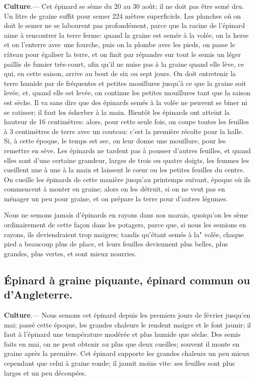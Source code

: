 \documentclass[10pt,a4paper]{book}
\begin{document}
\textbf{Culture}.--- Cet épinard se sème du 20 au 30 août; il ne doit pas être semé dru. Un litre de graine suffit pour semer 224 mètres superficiels. Les planches où on doit le semer ne se labourent pas profondément, parce que la racine de l'épinard aime à rencontrer la terre ferme: quand la graine est semée à la volée, on la herse et on l'enterre avec une fourche, puis on la plombe avec les pieds, on passe le râteau pour égaliser la terre, et on finit par répandre sur tout le semis un léger paillis de fumier très-court, afin qu'il ne nuise pas à la graine quand elle lève, ce qui, en cette saison, arrive au bout de six ou sept jours. On doit entretenir la terre humide par de fréquentes et petites mouillures jusqu'à ce que la graine soit levée, et, quand elle est levée, on continue les petites mouillures tant que la saison est sèche. Il va sans dire que des épinards semés à la volée ne peuvent se biner ni se ratisser; il faut les ésherber à la main. Bientôt les épinards ont atteint la hauteur de 16 centimètres: alors, pour cette seule fois, on coupe toutes les feuilles à 3 centimètres de terre avec un couteau: c'est la première récolte pour la halle. Si, à cette époque, le temps est sec, on leur donne une mouillure, pour les remettre en séve. Les épinards ne tardent pas à pousser d'autres feuilles, et quand elles sont d'une certaine grandeur, larges de trois ou quatre doigts, les femmes les cueillent une à une à la main et laissent le cœur ou les petites feuilles du centre. On cueille les épinards de cette manière jusqu'au printemps suivant, époque où ils commencent à monter en graine; alors on les détruit, si on ne veut pas en ménager un peu pour graine, et on prépare la terre pour d'autres légumes.

Nous ne semons jamais d'épinards en rayons dans nos marais, quoiqu'on les sème ordinairement de cette façon dans les potagers, parce que, si nous les semions en rayons, ils deviendraient trop maigres; tandis qu'étant semés à la" volée, chaque pied a beaucoup plus de place, et leurs feuilles deviennent plus belles, plus grandes, plus vertes, et sont mieux nourries.

\subsection{Épinard à graine piquante, épinard commun ou d'Angleterre.}

\textbf{Culture}.--- Nous semons cet épinard depuis les premiers jours de février jusqu'en mai; passé cette époque, les grandes chaleurs le rendent maigre et le font jaunir; il faut à l'épinard une température modérée et plus humide que sèche. Des semis faits en mai, on ne peut obtenir au plus que deux cueilles; souvent il monte en graine après la première. Cet épinard supporte les grandes chaleurs un peu mieux cependant que celui à graine ronde; il jaunit moins vite: ses feuilles sont plus larges et un peu découpées.
\end{document}
